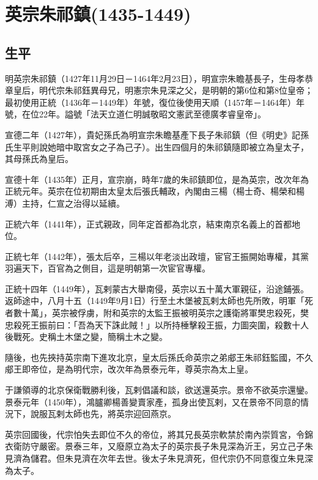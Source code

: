 
\section{英宗朱祁鎮\tiny(1435-1449)}

\subsection{生平}

明英宗朱祁鎮（1427年11月29日－1464年2月23日），明宣宗朱瞻基長子，生母孝恭章皇后，明代宗朱祁鈺異母兄，明憲宗朱見深之父，是明朝的第6位和第8位皇帝；最初使用正統（1436年－1449年）年號，復位後使用天順（1457年－1464年）年號，在位22年。謚號「法天立道仁明誠敬昭文憲武至德廣孝睿皇帝」。

宣德二年（1427年），貴妃孫氏為明宣宗朱瞻基產下長子朱祁鎮（但《明史》記孫氏生平則說她暗中取宮女之子為己子）。出生四個月的朱祁鎮隨即被立為皇太子，其母孫氏為皇后。

宣德十年（1435年）正月，宣宗崩，時年7歲的朱祁鎮即位，是為英宗，改次年為正統元年。英宗在位初期由太皇太后張氏輔政，內閣由三楊（楊士奇、楊榮和楊溥）主持，仁宣之治得以延續。

正統六年（1441年），正式親政，同年定首都為北京，結束南京名義上的首都地位。

正統七年（1442年），張太后卒，三楊以年老淡出政壇，宦官王振開始專權，其黨羽遍天下，百官為之側目，這是明朝第一次宦官專權。

正統十四年（1449年），瓦剌蒙古大舉南侵，英宗以五十萬大軍親征，沿途鋪張。返師途中，八月十五（1449年9月1日）行至土木堡被瓦剌太師也先所敗，明軍「死者數十萬」，英宗被俘虜，附和英宗的太監王振被明英宗之護衛將軍樊忠殺死，樊忠殺死王振前曰：「吾為天下誅此賊！」以所持棰擊殺王振，力圖突圍，殺數十人後戰死。史稱土木堡之變，簡稱土木之變。

隨後，也先挾持英宗南下進攻北京，皇太后孫氏命英宗之弟郕王朱祁鈺監國，不久郕王即帝位，是為明代宗，改次年為景泰元年，尊英宗為太上皇。

于謙領導的北京保衛戰勝利後，瓦剌倡議和談，欲送還英宗。景帝不欲英宗還鑾。景泰元年（1450年），鴻臚卿楊善變賣家產，孤身出使瓦剌，又在景帝不同意的情況下，說服瓦剌太師也先，將英宗迎回燕京。

英宗回國後，代宗怕失去即位不久的帝位，將其兄長英宗軟禁於南內崇質宮，令錦衣衛防守嚴密。景泰三年，又廢原立為太子的英宗長子朱見深為沂王，另立己子朱見濟為儲君。但朱見濟在次年去世。後太子朱見濟死，但代宗仍不同意復立朱見深為太子。

